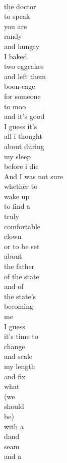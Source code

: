 \documentclass[smalldemyvopaper,11pt,twoside,onecolumn,openright,extrafontsizes]{memoir}
\begin{document}
\\the doctor
\\to speak
\\you are
\\randy
\\and hungry
\\I baked
\\two eggcakes
\\and left them
\\boon-cage
\\for someone
\\to moo
\\and it's good
\\I guess it's
\\all i thought
\\about during
\\my sleep
\\before i die
\\And I was not sure
\\whether to
\\wake up
\\to find a
\\truly
\\comfortable
\\clown
\\or to be set
\\about
\\the father
\\of the state
\\and of
\\the state's
\\becoming
\\me
\\I guess
\\it's time to
\\change
\\and scale
\\my length
\\and fix
\\what
\\(we
\\should
\\be)
\\with a
\\dand
\\seam
\\and a
\end{document}

